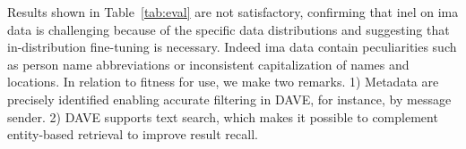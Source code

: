 


Results shown in Table~\ref{tab:eval} are not satisfactory, confirming that \ac{inel} on \ac{ima} data is challenging because of the specific data distributions and suggesting that in-distribution fine-tuning is necessary. %
Indeed \ac{ima} data contain peculiarities such as person name abbreviations or inconsistent capitalization of names and locations. In relation to fitness for use, we make two remarks. 1) Metadata are precisely identified enabling accurate filtering in DAVE, for instance, by message sender. 2) DAVE supports text search, which makes it possible to complement entity-based retrieval to improve result recall.        


